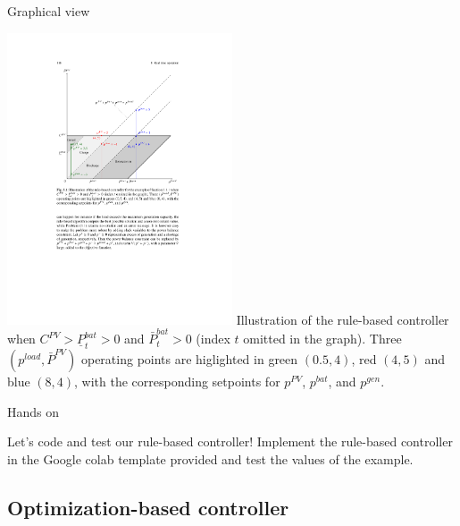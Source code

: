 \begin{frame}{Graphical view}
\begin{multicols}{2}
\includegraphics[width=0.5\textwidth]{images/RB_graphical.pdf}
Illustration of the rule-based controller when $C^{PV} > \underline{P}^{bat}_t > 0$ and $\bar{P}^{bat}_t >0$ (index $t$ omitted in the graph).  Three $(p^{load}, \bar{P}^{PV})$ operating points are higlighted in green $(0.5,4)$, red $(4,5)$ and blue $(8,4)$, with the corresponding setpoints for $p^{PV}$, $p^{bat}$, and $p^{gen}$.
\end{multicols}
\end{frame}

\begin{frame}{Hands on}
    \begin{block}{Let's code and test our rule-based controller! }
        Implement the rule-based controller in the Google colab template provided and test the values of the example.
    \end{block}    
\end{frame}


\subsection{Optimization-based controller}

